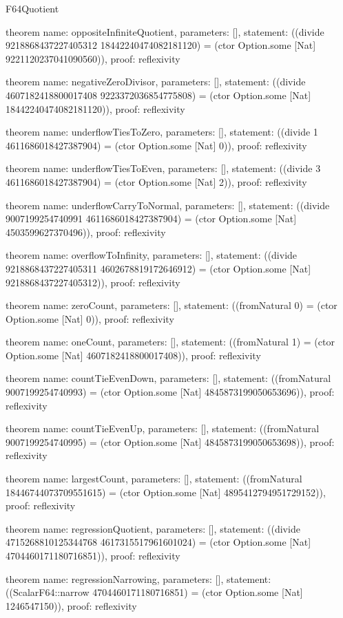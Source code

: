 \begin{lexlean}{F64Quotient}
\begin{semanticmodule}
theorem{
  name: oppositeInfiniteQuotient,
  parameters: [],
  statement: ((divide 9218868437227405312 18442240474082181120) = (ctor Option.some [Nat] 9221120237041090560)),
  proof: reflexivity{}
}

theorem{
  name: negativeZeroDivisor,
  parameters: [],
  statement: ((divide 4607182418800017408 9223372036854775808) = (ctor Option.some [Nat] 18442240474082181120)),
  proof: reflexivity{}
}

theorem{
  name: underflowTiesToZero,
  parameters: [],
  statement: ((divide 1 4611686018427387904) = (ctor Option.some [Nat] 0)),
  proof: reflexivity{}
}

theorem{
  name: underflowTiesToEven,
  parameters: [],
  statement: ((divide 3 4611686018427387904) = (ctor Option.some [Nat] 2)),
  proof: reflexivity{}
}

theorem{
  name: underflowCarryToNormal,
  parameters: [],
  statement: ((divide 9007199254740991 4611686018427387904) = (ctor Option.some [Nat] 4503599627370496)),
  proof: reflexivity{}
}

theorem{
  name: overflowToInfinity,
  parameters: [],
  statement: ((divide 9218868437227405311 4602678819172646912) = (ctor Option.some [Nat] 9218868437227405312)),
  proof: reflexivity{}
}

theorem{
  name: zeroCount,
  parameters: [],
  statement: ((fromNatural 0) = (ctor Option.some [Nat] 0)),
  proof: reflexivity{}
}

theorem{
  name: oneCount,
  parameters: [],
  statement: ((fromNatural 1) = (ctor Option.some [Nat] 4607182418800017408)),
  proof: reflexivity{}
}

theorem{
  name: countTieEvenDown,
  parameters: [],
  statement: ((fromNatural 9007199254740993) = (ctor Option.some [Nat] 4845873199050653696)),
  proof: reflexivity{}
}

theorem{
  name: countTieEvenUp,
  parameters: [],
  statement: ((fromNatural 9007199254740995) = (ctor Option.some [Nat] 4845873199050653698)),
  proof: reflexivity{}
}

theorem{
  name: largestCount,
  parameters: [],
  statement: ((fromNatural 18446744073709551615) = (ctor Option.some [Nat] 4895412794951729152)),
  proof: reflexivity{}
}

theorem{
  name: regressionQuotient,
  parameters: [],
  statement: ((divide 4715268810125344768 4617315517961601024) = (ctor Option.some [Nat] 4704460171180716851)),
  proof: reflexivity{}
}

theorem{
  name: regressionNarrowing,
  parameters: [],
  statement: ((ScalarF64::narrow 4704460171180716851) = (ctor Option.some [Nat] 1246547150)),
  proof: reflexivity{}
}


\end{semanticmodule}
\end{lexlean}
